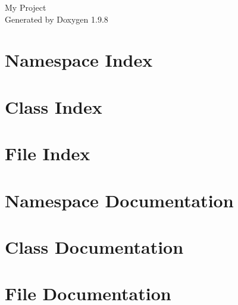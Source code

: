 \documentclass[twoside]{book}
\newcommand{\+}{\discretionary{\mbox{\scriptsize$\hookleftarrow$}}{}{}}
\newcommand{\clearemptydoublepage}{%
    \newpage{\pagestyle{empty}\cleardoublepage}%
  }
\begin{document}
  \raggedbottom
    \hypersetup{pageanchor=false,
                bookmarksnumbered=true,
                pdfencoding=unicode
               }
  \begin{titlepage}
  \vspace*{7cm}
  \begin{center}%
  {\Large My Project}\\
  \vspace*{1cm}
  {\large Generated by Doxygen 1.9.8}\\
  \end{center}
  \end{titlepage}
  \clearemptydoublepage
  \tableofcontents
  \clearemptydoublepage
  \hypersetup{pageanchor=true}
\chapter{Namespace Index}

\chapter{Class Index}

\chapter{File Index}

\chapter{Namespace Documentation}






\chapter{Class Documentation}



\chapter{File Documentation}






  \backmatter
  \newpage
  \clearemptydoublepage
  \printindex
\end{document}
